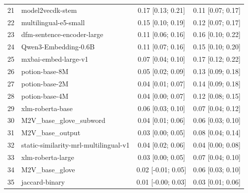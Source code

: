 \begin{table}[t]
\begin{tabular}{rlcc}
21 & model2vecdk-stem & 0.17 [0.13; 0.21] & 0.11 [0.07; 0.17] \\
22 & multilingual-e5-small & 0.15 [0.10; 0.19] & 0.12 [0.07; 0.17] \\
23 & dfm-sentence-encoder-large & 0.11 [0.06; 0.16] & 0.16 [0.10; 0.22] \\
24 & Qwen3-Embedding-0.6B & 0.11 [0.07; 0.16] & 0.15 [0.10; 0.20] \\
25 & mxbai-embed-large-v1 & 0.07 [0.04; 0.10] & 0.17 [0.12; 0.22] \\
26 & potion-base-8M & 0.05 [0.02; 0.09] & 0.13 [0.09; 0.18] \\
27 & potion-base-2M & 0.04 [0.01; 0.07] & 0.14 [0.09; 0.18] \\
28 & potion-base-4M & 0.04 [0.00; 0.07] & 0.12 [0.08; 0.15] \\
29 & xlm-roberta-base & 0.06 [0.03; 0.10] & 0.07 [0.04; 0.12] \\
30 & M2V\_base\_glove\_subword & 0.04 [0.01; 0.06] & 0.06 [0.03; 0.10] \\
31 & M2V\_base\_output & 0.03 [0.00; 0.05] & 0.08 [0.04; 0.14] \\
32 & static-similarity-mrl-multilingual-v1 & 0.04 [0.02; 0.06] & 0.04 [0.00; 0.08] \\
33 & xlm-roberta-large & 0.03 [0.00; 0.05] & 0.07 [0.04; 0.10] \\
34 & M2V\_base\_glove & 0.02 [-0.01; 0.05] & 0.06 [0.03; 0.10] \\
35 & jaccard-binary & 0.01 [-0.00; 0.03] & 0.03 [0.01; 0.06] \\
\bottomrule
\end{tabular}
\end{table}
